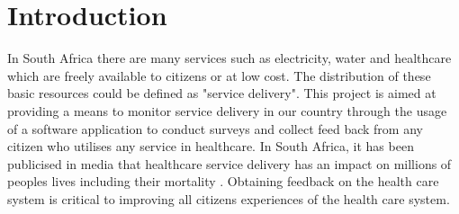 \documentclass[12pt]{witseiepaper}
\begin{document}







\pagestyle{plain}


\tableofcontents

\newpage
\listoffigures %
\newpage
\listoftables %
\newpage
\renewcommand\thesection{\arabic{section}}
\renewcommand\thesubsection{\thesection.\arabic{subsection}}
 \setcounter{section}{0}
\setcounter{page}{1}
%
\section{Introduction}
In South Africa there are many services such as electricity, water and healthcare which are freely available to citizens or at low cost. The distribution of these basic resources could be defined as "service delivery". This project is aimed at providing a means to monitor service delivery in our country through the usage of a software application to conduct surveys and collect feed back from any citizen who utilises any service in healthcare. In South Africa, it has been publicised in media that healthcare service delivery has an impact on millions of peoples lives including their mortality \cite{InfantsDie}. Obtaining feedback on the health care system is critical to improving all citizens experiences of the health care system.
\end{document}
